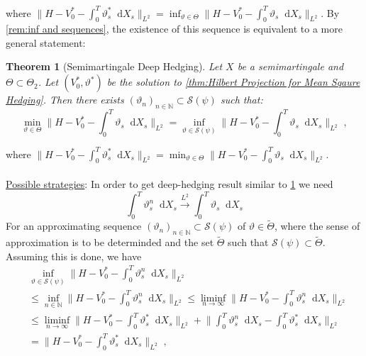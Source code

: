 \documentclass[11pt]{report}
\newcommand{\diff}{\mathop{}\!\mathrm{d}}
\theoremstyle{plain} %
\newtheorem{theorem}{Theorem}[chapter]
\theoremstyle{definition} %
\theoremstyle{remark} %
\begin{document}
where \(\lVert H-V_0^*-\int_{0}^T\vartheta_s^{*}\diff X_s\rVert_{L^2}=\inf_{\vartheta\in\Theta}\lVert H-V_0^*-\int_{0}^T\vartheta_s\diff X_s\rVert_{L^2}\).
By \cref{rem:inf and sequences}, the existence of this sequence is equivalent to a more general statement:
\begin{theorem}[Semimartingale Deep Hedging]\label{thm:general deep hedging}
    Let \(X\) be a semimartingale and \(\Theta\subset\Theta_2\). Let \((V_0^*,\vartheta^*)\) be the solution to \cref{thm:Hilbert Projection for Mean Sqaure Hedging}. Then there exists \((\vartheta_n)_{n\in\mathbb{N}}\subset\mathcal{S}(\mathcal{\psi})\) such that:
    \begin{equation}
        \min_{\vartheta\in \Theta}\lVert H-V_0^*-\int_{0}^T\vartheta_s\diff X_s\rVert_{L^2}=\inf_{\vartheta\in\mathcal{S}(\psi)}\lVert H-V_0^*-\int_{0}^T\vartheta_s\diff X_s\rVert_{L^2}\;,
    \end{equation}
\end{theorem}
where \(\lVert H-V_0^*-\int_{0}^T\vartheta^*_s\diff X_s\rVert_{L^2}=\min_{\vartheta\in \Theta}\lVert H-V_0^*-\int_{0}^T\vartheta_s\diff X_s\rVert_{L^2}\).
\\\\
\newpage
\underline{Possible strategies}:
In order to get deep-hedging result similar to \cref{thm:general deep hedging} we need 
\begin{equation}
    \int_0^T\vartheta^n_s\diff X_s \overset{L^2}{\to} \int_0^T\vartheta_s\diff X_s
\end{equation}
For an approximating sequence \((\vartheta_n)_{n\in\mathbb{N}}\subset\mathcal{S}(\psi)\) of \(\vartheta\in\tilde{\Theta}\), where the sense of approximation is to be determinded and the set \(\tilde{\Theta}\) such that \(\mathcal{S}(\psi)\subset\tilde{\Theta}\). Assuming this is done, we have
\begin{align*}
  &\inf_{\vartheta\in\mathcal{S}(\psi)}\lVert H-V_0^*-\int_0^T \vartheta_s^n\diff X_s\rVert_{L^2}\\&\leq
    \inf_{n\in\mathbb{N}}\lVert H-V_0^*-\int_0^T \vartheta_s^n\diff X_s\rVert_{L^2}\leq \liminf_{n\to\infty}\lVert H-V_0^*-\int_0^T \vartheta_s^n\diff X_s\rVert_{L^2}
    \\&\leq \liminf_{n\to\infty}\lVert H-V_0^*-\int_0^T \vartheta_s^*\diff X_s\rVert_{L^2}+\lVert \int_0^T \vartheta_s^n\diff X_s-\int_0^T \vartheta_s^*\diff X_s\rVert_{L^2}\\&=\lVert H-V_0^*-\int_0^T \vartheta_s^*\diff X_s\rVert_{L^2}\;,
\end{align*}
\end{document}
